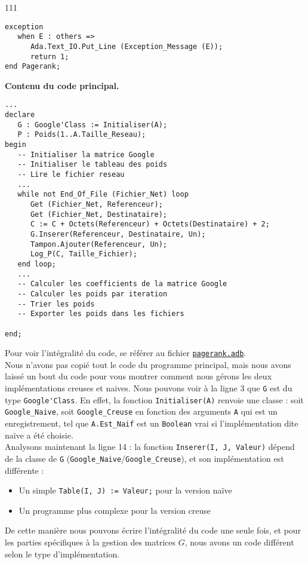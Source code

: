 \begin{dinglist}{111}
\begin{lstlisting}[caption=Astuce de la fonction principale]
exception
   when E : others =>
      Ada.Text_IO.Put_Line (Exception_Message (E));
      return 1;
end Pagerank;
   \end{lstlisting}

   \item \textbf{Contenu du code principal.}
   \begin{lstlisting}[caption=Contenur du programme principal]
...
declare
   G : Google'Class := Initialiser(A);
   P : Poids(1..A.Taille_Reseau);
begin
   -- Initialiser la matrice Google
   -- Initialiser le tableau des poids
   -- Lire le fichier reseau
   ...
   while not End_Of_File (Fichier_Net) loop
      Get (Fichier_Net, Referenceur);
      Get (Fichier_Net, Destinataire);
      C := C + Octets(Referenceur) + Octets(Destinataire) + 2;
      G.Inserer(Referenceur, Destinataire, Un);
      Tampon.Ajouter(Referenceur, Un);
      Log_P(C, Taille_Fichier);
   end loop;
   ...
   -- Calculer les coefficients de la matrice Google
   -- Calculer les poids par iteration
   -- Trier les poids
   -- Exporter les poids dans les fichiers

end;
         \end{lstlisting}
      Pour voir l'intégralité du code, se référer au fichier \href{https://raw.githubusercontent.com/seba1204/cours/master/n7/s5/pim/tp/projet/src/pagerank.adb}{\lstinline{pagerank.adb}}.\\
      Nous n'avons pas copié tout le code du programme principal, mais nous avons laissé un bout du code pour vous montrer comment nous gérons les deux implémentations creuses et naives. Nous pouvons voir à la ligne 3 que \lstinline{G} est du type \lstinline{Google'Class}.
      En effet, la fonction \lstinline{Initialiser(A)} renvoie une classe : soit \lstinline{Google_Naive}, soit \lstinline{Google_Creuse} en fonction des arguments \lstinline{A} qui est un enregistrement, 
      tel que \lstinline{A.Est_Naif} est un \lstinline{Boolean} vrai si l'implémentation dite naïve a été choisie. \\
      Analysons maintenant la ligne 14 : la fonction \lstinline{Inserer(I, J, Valeur)} dépend de la classe de \lstinline{G} (\lstinline{Google_Naive}/\lstinline{Google_Creuse}), et son implémentation est différente : 
      \begin{itemize}
         \item Un simple \lstinline{Table(I, J) := Valeur;} pour la version naïve
         \item Un programme plus complexe pour la version creuse
      \end{itemize}

      De cette manière nous pouvons écrire l'intégralité du code une seule fois, et pour les parties spécifiques à la gestion des matrices $G$, nous avons un code différent selon le type d'implémentation.
\end{dinglist}